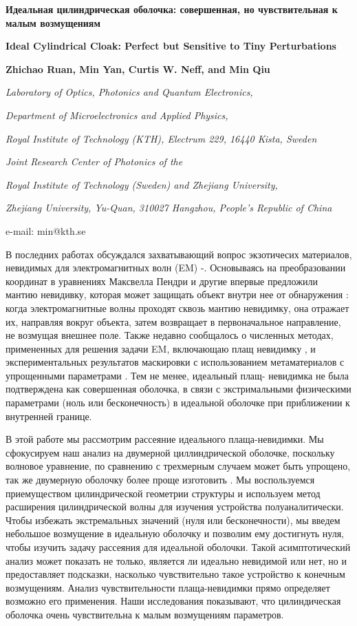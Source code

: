 \documentclass[a4paper, 12pt]{article}
\newcommand{\tit}[1]{\begin{center}{\bf{\Large #1}}\end{center}}
\newcommand{\aut}[1]{\centerline{{\bf #1}}}
\newcommand{\cityorg}[1]{\centerline{\it #1}}
\newcommand{\email}[1]{\centerline{{\small e-mail: #1}}\vspace{\baselineskip}}
\begin{document}
\sloppy

 \tit{Идеальная цилиндрическая оболочка: совершенная, но чувствительная к малым возмущениям}
 \tit{Ideal Cylindrical Cloak: Perfect but Sensitive to Tiny Perturbations}
 \aut{Zhichao Ruan, Min Yan, Curtis W. Neff, and Min Qiu}
 \cityorg{Laboratory of Optics, Photonics and Quantum Electronics,} 
 \cityorg{Department of Microelectronics and Applied Physics,} 
 \cityorg{Royal Institute of Technology (KTH), Electrum 229, 16440 Kista, Sweden}
 \cityorg{Joint Research Center of Photonics of the}
 \cityorg{Royal Institute of Technology (Sweden) and Zhejiang University,}
 \cityorg{Zhejiang University, Yu-Quan, 310027 Hangzhou, People’s Republic of China}
 \email{min@kth.se}

\begin{abstract}
\end{abstract}

В последних работах обсуждался захватывающий вопрос экзотичесих материалов, невидимых для электромагнитных волн
(EM) \cite{1}-\cite{11}. Основываясь на преобразовании координат в уравнениях Максвелла Пендри и другие впервые
предложили мантию невидивку, которая может защищать объект внутри нее от обнаружения \cite{1}: когда 
электромагнитные волны проходят сквозь мантию невидимку, она отражает их, направляя вокруг объекта, затем
возвращает в первоначальное направление, не возмущая внешнее поле. Также недавно сообщалось о численных методах,
примененных для решения задачи EM, включающаю плащ невидимку \cite{6,9}, и экспериментальных результатов 
маскировки с использованием метаматериалов с упрощенными параметрами \cite{7}. Тем не менее, идеальный плащ-
невидимка не была подтверждена как совершенная оболочка, в связи с экстримальными физическими параметрами (ноль 
или бесконечность) в идеальной оболочке при приближении к внутренней границе.

В этой работе мы рассмотрим рассеяние идеального плаща-невидимки. Мы сфокусируем наш анализ на двумерной циллиндрической
оболочке, поскольку волновое уравнение, по сравнению с трехмерным случаем может быть упрощено, так же двумерную оболочку
более проще изготовить \cite{7}. Мы воспользуемся приемуществом цилиндрической геометрии структуры и используем
метод расширения цилиндрической волны для изучения устройства полуаналитически. Чтобы избежать экстремальных значений
(нуля или бесконечности), мы введем небольшое возмущение в идеальную оболочку и позволим ему достигнуть нуля, чтобы
изучить задачу рассеяния для идеальной оболочки. Такой асимптотический анализ может показать не только, является ли
идеально невидимой или нет, но и предоставляет подсказки, насколько чувствительно такое устройство к конечным 
возмущениям. Анализ чувствительности плаща-невидимки прямо определяет возможно его применения. Наши исследования 
показывают, что цилиндическая оболочка очень чувствительна к малым возмущениям параметров.
\end{document}
